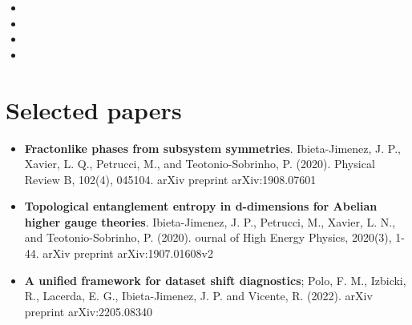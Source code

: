 \documentclass[11pt,a4paper,sans]{moderncv}        %
\begin{document}
\begin{itemize}

\item{}  %

\vspace{1pt}

\item{}

\vspace{1pt}

\item{}

\vspace{1pt}


\item{}  %


\end{itemize}
\section{Selected papers}

\vspace{3pt}

\begin{itemize}
\item \textbf{Fractonlike phases from subsystem symmetries}. Ibieta-Jimenez, J. P., Xavier, L. Q., Petrucci, M., and Teotonio-Sobrinho, P. (2020). Physical Review B, 102(4), 045104. arXiv preprint arXiv:1908.07601
\vspace{1pt}
\item \textbf{Topological entanglement entropy in d-dimensions for Abelian higher gauge theories}. Ibieta-Jimenez, J. P., Petrucci, M., Xavier, L. N., and Teotonio-Sobrinho, P. (2020). ournal of High Energy Physics, 2020(3), 1-44. arXiv preprint arXiv:1907.01608v2
\vspace{1pt}
\item \textbf{A unified framework for dataset shift diagnostics}; Polo, F. M., Izbicki, R., Lacerda, E. G., Ibieta-Jimenez, J. P. and Vicente, R. (2022). arXiv preprint arXiv:2205.08340
\end{itemize}
\end{document}
